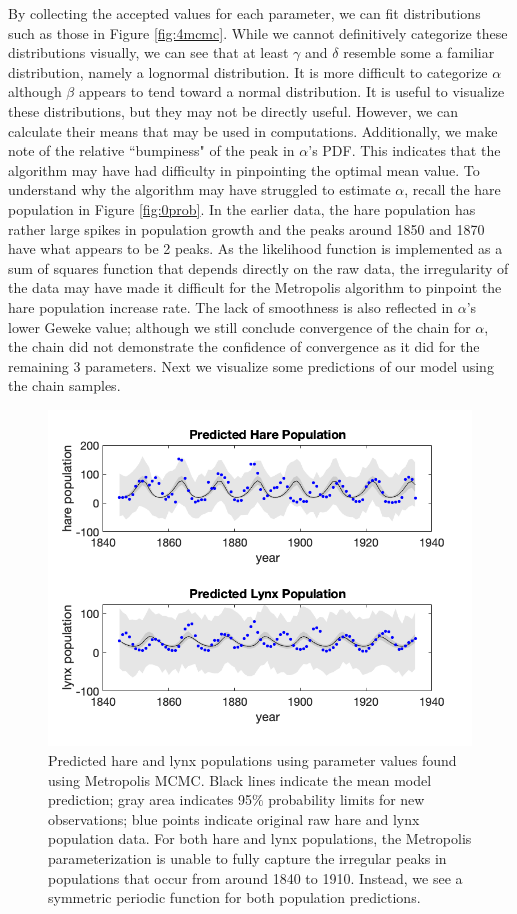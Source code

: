 By collecting the accepted values for each parameter, we can fit distributions such as those in Figure \ref{fig:4mcmc}. While we cannot definitively categorize these distributions visually, we can see that at least $\gamma$ and $\delta$ resemble some a familiar distribution, namely a lognormal distribution. It is more difficult to categorize $\alpha$ although $\beta$ appears to tend toward a normal distribution. It is useful to visualize these distributions, but they may not be directly useful. However, we can calculate their means that may be used in computations. Additionally, we make note of the relative ``bumpiness" of the peak in $\alpha$'s PDF. This indicates that the algorithm may have had difficulty in pinpointing the optimal mean value. To understand why the algorithm may have struggled to estimate $\alpha$, recall the hare population in Figure \ref{fig:0prob}. In the earlier data, the hare population has rather large spikes in population growth and the peaks around 1850 and 1870 have what appears to be 2 peaks. As the likelihood function is implemented as a sum of squares function that depends directly on the raw data, the irregularity of the data may have made it difficult for the Metropolis algorithm to pinpoint the hare population increase rate.  The lack of smoothness is also reflected in $\alpha$'s lower Geweke value; although we still conclude convergence of the chain for $\alpha$, the chain did not demonstrate the confidence of convergence as it did for the remaining 3 parameters. Next we visualize some predictions of our model using the chain samples.
\begin{figure}[H]
    \centering
    \includegraphics[width=15cm]{MCMC_figs/final_mh_modpred.png}
    \caption{Predicted hare and lynx populations using parameter values found using Metropolis MCMC. Black lines indicate the mean model prediction; gray area indicates 95$\%$ probability limits for new observations; blue points indicate original raw hare and lynx population data. For both hare and lynx populations, the Metropolis parameterization is unable to fully capture the irregular peaks in populations that occur from around 1840 to 1910. Instead, we see a symmetric periodic function for both population predictions.}
    \label{fig:5mcmc}
\end{figure}
